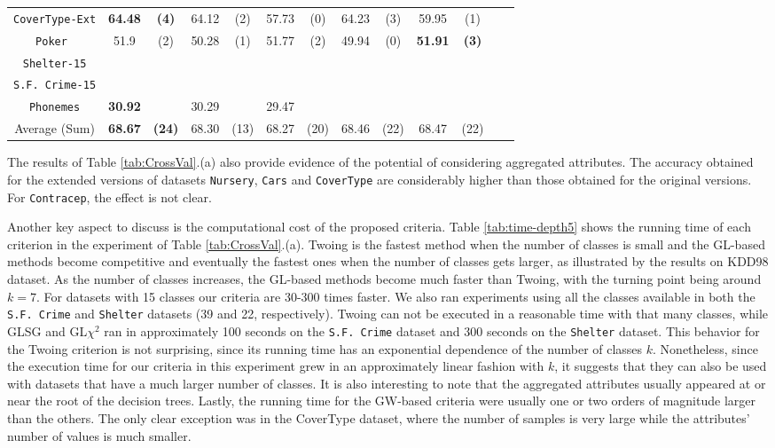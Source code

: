 \begin{table*}[t]
\begin{tabular}{c|cc|cc|cc|cc|cc|cc}
{\tt CoverType-Ext} & {\bf  64.48} & {\bf  (4)} & 64.12 & (2) & 57.73 & (0) & 64.23 & (3) & 59.95 & (1) & & \\ 
{\tt Poker } & 51.9 & (2) &50.28 & (1) & 51.77 & (2) & 49.94 & (0) & {\bf  51.91} & {\bf  (3)} & & \\ 
{\tt Shelter-15}   &  &  &  &  &  & & &  &  & & &        \\   
{\tt S.F. Crime-15} &  &  & &  & & & &  &  & & &       \\ 
{\tt Phonemes}      & {\bf 30.92 } &  & 30.29 &  & 29.47 & & &  &  & & &       \\
\hline
Average (Sum) &             {\bf  68.67}  &  {\bf  (24)}  & 68.30  &  (13)  & 68.27 &  (20)   & 68.46 &  (22)   & 68.47 &  (22) & & 

\end{tabular}
\label{exp:thirdset}
\normalsize
\end{table*}


The results of  Table \ref{tab:CrossVal}.(a) also
provide evidence of  the potential
of considering aggregated attributes. 
The accuracy obtained for the extended versions of datasets
{\tt Nursery}, {\tt Cars} and {\tt CoverType} are considerably higher than those obtained for 
the original versions. For {\tt Contracep}, the effect is not clear.

Another key aspect to discuss is the computational cost of the
proposed criteria. Table \ref{tab:time-depth5} shows the running time of each criterion in the experiment of Table \ref{tab:CrossVal}.(a). Twoing is the fastest method when the number of classes is small and the GL-based methods become competitive and eventually the
fastest ones when the number of classes gets larger, as illustrated by the results on KDD98 dataset. As the number of classes increases, the GL-based methods become much faster than Twoing, with the turning point being around $k=7$. For datasets with 15 classes our criteria are 30-300 times faster. We also ran experiments using all the classes available in both the {\tt S.F. Crime} and {\tt Shelter} datasets (39 and 22, respectively). Twoing can not be executed in a reasonable time with that many classes, while GLSG and GL$\chi^2$ ran in approximately 100 seconds on the {\tt S.F. Crime} dataset and  300 seconds on the {\tt Shelter} dataset.  This behavior for the Twoing criterion is not surprising, since its running time has an exponential dependence of the number of classes $k$. Nonetheless, since the execution time for our criteria in this experiment grew in an approximately linear fashion with $k$, it suggests that they can also be used with datasets that have a much larger number of classes. It is also interesting to note that the aggregated attributes usually appeared at or near the root of the decision trees. Lastly, the running time for the GW-based criteria were usually one or two orders of magnitude larger than the others. The only clear exception was in the CoverType dataset, where the number of samples is very large while the attributes’ number of values is much smaller.

